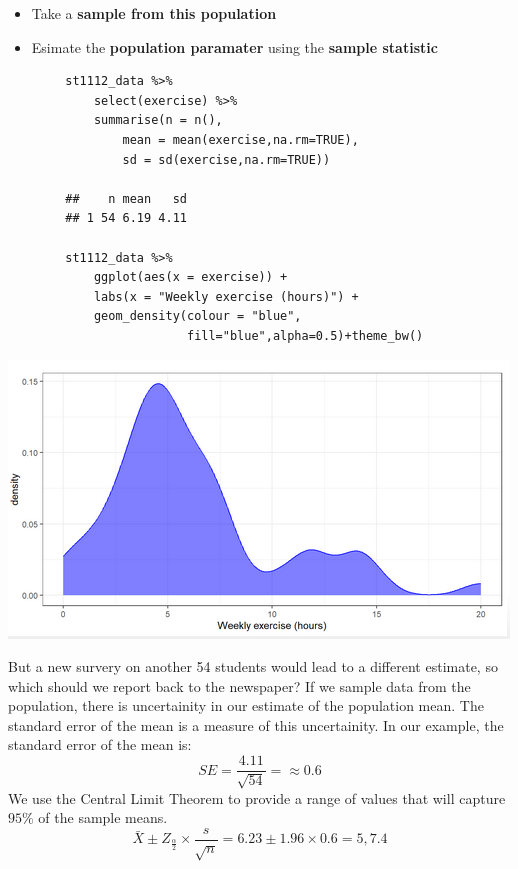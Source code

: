 \documentclass[a4paper, 10pt]{article}
\begin{document}
\begin{examplebox}
    \begin{itemize}
        \item Take a \textbf{sample from this population}
        \item Esimate the \textbf{population paramater} using the \textbf{sample statistic}
    \end{itemize}

    \begin{lstlisting}
        st1112_data %>% 
            select(exercise) %>% 
            summarise(n = n(),
                mean = mean(exercise,na.rm=TRUE),
                sd = sd(exercise,na.rm=TRUE))
        
        ##    n mean   sd
        ## 1 54 6.19 4.11

        st1112_data %>% 
            ggplot(aes(x = exercise)) + 
            labs(x = "Weekly exercise (hours)") +
            geom_density(colour = "blue", 
                         fill="blue",alpha=0.5)+theme_bw()
    \end{lstlisting}
    \begin{center}
        \includegraphics[scale=0.5]{images/exercise.png}
    \end{center}

    But a new survery on another 54 students would lead to a different estimate, so which should we report back to the newspaper?
    If we sample data from the population, there is uncertainity in our estimate of the population mean.
    The standard error of the mean is a measure of this uncertainity. In our example, the standard error of the mean is:
    $$SE = \frac{4.11}{\sqrt{54}} = \approx 0.6$$
    We use the Central Limit  Theorem to provide a range of values that will capture $95\%$ of the sample means.
    $$\bar{X} \pm Z_{\frac{\alpha}{2}} \times \frac{s}{\sqrt{n}} = 6.23 \pm 1.96 \times 0.6 = 5, 7.4$$
\end{examplebox}
\end{document}
